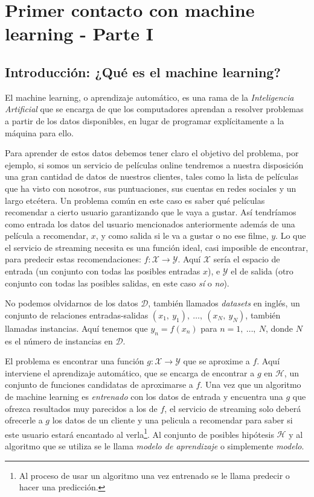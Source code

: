 \chapter{Primer contacto con machine learning - Parte I} \label{chap:2}

\vspace*{5mm}

\section{Introducción: ¿Qué es el machine learning?} \label{sec:2.1}

El machine learning, o aprendizaje automático, es una rama de la \emph{Inteligencia Artificial} que se encarga de que los computadores aprendan a resolver problemas a partir de los datos disponibles, en lugar de programar explícitamente a la máquina para ello.

Para aprender de estos datos debemos tener claro el objetivo del problema, por ejemplo, si somos un servicio de películas online tendremos a nuestra disposición una gran cantidad de datos de nuestros clientes, tales como la lista de películas que ha visto con nosotros, sus puntuaciones, sus cuentas en redes sociales y un largo etcétera. Un problema común en este caso es saber qué películas recomendar a cierto usuario garantizando que le vaya a gustar. Así tendríamos como entrada los datos del usuario mencionados anteriormente además de una película a recomendar, $x$, y como salida si le va a gustar o no ese filme, $y$. Lo que el servicio de streaming necesita es una función ideal, casi imposible de encontrar, para predecir estas recomendaciones: $f: \mathcal{X} \rightarrow \mathcal{Y}$. Aquí $\mathcal{X}$ sería el espacio de entrada (un conjunto con todas las posibles entradas $x$), e $\mathcal{Y}$ el de salida (otro conjunto con todas las posibles salidas, en este caso \emph{sí} o \emph{no}).

No podemos olvidarnos de los datos $\mathcal{D}$, también llamados \emph{datasets} en inglés, un conjunto de relaciones entradas-salidas $(x_{1},\:y_{1}),\:\dots,\:(x_{N},\:y_{N})$, también llamadas instancias. Aquí tenemos que $y_{n} = f(x_{n})$ para $n = 1,\:\dots,\:N$, donde $N$ es el número de instancias en $\mathcal{D}$.

El problema es encontrar una función $g: \mathcal{X} \rightarrow \mathcal{Y}$ que se aproxime a $f$. Aquí interviene el aprendizaje automático, que se encarga de encontrar a $g$ en $\mathcal{H}$, un conjunto de funciones candidatas de aproximarse a $f$. Una vez que un algoritmo de machine learning es \emph{entrenado} con los datos de entrada y encuentra una $g$ que ofrezca resultados muy parecidos a los de $f$, el servicio de streaming solo deberá ofrecerle a $g$ los datos de un cliente y una pelicula a recomendar para saber si este usuario estará encantado al verla\footnote{Al proceso de usar un algoritmo una vez entrenado se le llama predecir o hacer una predicción.}. Al conjunto de posibles hipótesis $\mathcal{H}$ y al algoritmo que se utiliza se le llama \emph{modelo de aprendizaje} o simplemente \emph{modelo}.

